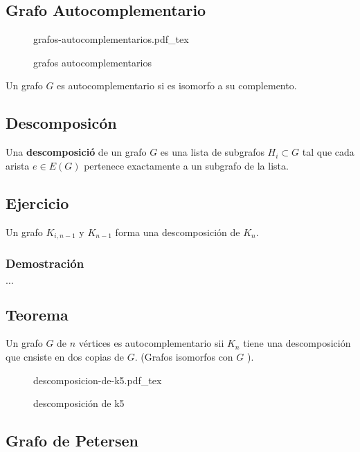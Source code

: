 \documentclass[a4paper]{book}
\newcommand{\incfig}[2][1]{%
    \def\svgwidth{#1\columnwidth}
    {#2.pdf_tex}
}
\begin{document}
\subsection{Grafo Autocomplementario}
\label{ssec:grafo_autocomplementario}

\begin{figure}[ht]
    \centering
    \incfig[0.5]{grafos-autocomplementarios}
    \caption{grafos autocomplementarios}
    \label{fig:grafos-autocomplementarios}
\end{figure}

Un grafo \(G\) es autocomplementario si es isomorfo a su complemento.

\subsection{Descomposicón}
\label{ssec:descomposicon}

Una \textbf{descomposició} de un grafo \(G\) es una lista de subgrafos
\(H_{i}\subset G\) tal que cada arista \(e\in E\left(G\right)\) pertenece
exactamente a un subgrafo de la lista.

\subsection{Ejercicio}
Un grafo \(K_{i,n-1} \text{ y } K_{n-1}\) forma una descomposición de \(K_{n}\).

\subsubsection{Demostración}

\(\ldots\)

\subsection{Teorema}

Un grafo \(G\) de \(n\) vértices es autocomplementario sii \(K_{n}\) tiene una
descomposición que cnsiste en dos copias de \(G\). (Grafos isomorfos con \(G\)
).

\begin{figure}[ht]
    \centering
    \incfig[0.5]{descomposicion-de-k5}
    \caption{descomposición de k5}
    \label{fig:descomposición-de-k5}
\end{figure}


\subsection{Grafo de Petersen}
\label{ssec:grafo_de_petersen}
\end{document}
